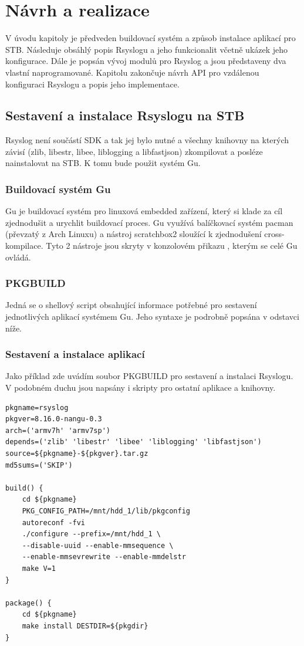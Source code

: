 \documentclass[thesis=B,czech]{FITthesis}[2012/06/26]
\begin{document}
\chapter{Návrh a realizace}
V úvodu kapitoly je předveden buildovací systém a způsob instalace aplikací pro STB.
Následuje obsáhlý popis Rsyslogu a jeho funkcionalit včetně ukázek jeho konfigurace.
Dále je popsán vývoj modulů pro Rsyslog a jsou představeny dva vlastní naprogramované.
Kapitolu zakončuje návrh API pro vzdálenou konfiguraci Rsyslogu a popis jeho implementace.

\section{Sestavení a instalace Rsyslogu na STB}
Rsyslog není součástí SDK a tak jej bylo nutné a všechny knihovny na kterých závisí (zlib, libestr, libee, liblogging a libfastjson) zkompilovat a posléze nainstalovat na STB. K tomu bude použit systém Gu.

\subsection{Buildovací systém Gu}
Gu je buildovací systém pro linuxová embedded zařízení, který si klade za cíl zjednodušit a urychlit buildovací proces. Gu využívá balíčkovací systém pacman (převzatý z Arch Linuxu) a nástroj scratchbox2 sloužící k zjednodušení cross-kompilace. Tyto 2 nástroje jsou skryty v konzolovém přikazu , kterým se celé Gu ovládá.

\subsection{PKGBUILD}
Jedná se o shellový script obsahující informace potřebné pro sestavení jednotlivých aplikací systémem Gu. Jeho syntaxe je podrobně popsána v odstavci níže.

\subsection{Sestavení a instalace aplikací}
Jako příklad zde uvádím soubor PKGBUILD pro sestavení a instalaci Rsyslogu. V podobném duchu jsou napsány i skripty pro ostatní aplikace a knihovny.
\begin{lstlisting}[style=PKGBuildStyle]
pkgname=rsyslog
pkgver=8.16.0-nangu-0.3
arch=('armv7h' 'armv7sp')
depends=('zlib' 'libestr' 'libee' 'liblogging' 'libfastjson')
source=${pkgname}-${pkgver}.tar.gz
md5sums=('SKIP')

build() {
	cd ${pkgname}
	PKG_CONFIG_PATH=/mnt/hdd_1/lib/pkgconfig
	autoreconf -fvi
	./configure --prefix=/mnt/hdd_1 \
	--disable-uuid --enable-mmsequence \
	--enable-mmsevrewrite --enable-mmdelstr
	make V=1
}

package() {
	cd ${pkgname}
	make install DESTDIR=${pkgdir}
}
\end{lstlisting}
\end{document}
